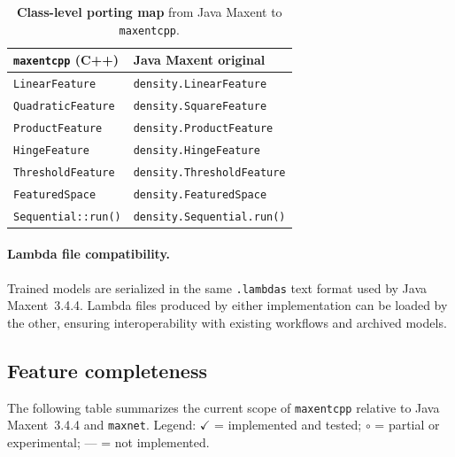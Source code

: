 \documentclass[10pt,letterpaper]{article}
\begin{document}
\begin{table}[!ht]
\centering
\caption{{\bf Class-level porting map} from Java Maxent to
         \texttt{maxentcpp}.}
\begin{tabular}{|l|l|}
\hline
\textbf{\texttt{maxentcpp} (C++)} & \textbf{Java Maxent original} \\
\hline
\texttt{LinearFeature}      & \texttt{density.LinearFeature}    \\
\hline
\texttt{QuadraticFeature}   & \texttt{density.SquareFeature}    \\
\hline
\texttt{ProductFeature}     & \texttt{density.ProductFeature}   \\
\hline
\texttt{HingeFeature}       & \texttt{density.HingeFeature}     \\
\hline
\texttt{ThresholdFeature}   & \texttt{density.ThresholdFeature} \\
\hline
\texttt{FeaturedSpace}      & \texttt{density.FeaturedSpace}    \\
\hline
\texttt{Sequential::run()}  & \texttt{density.Sequential.run()} \\
\hline
\end{tabular}
\label{tab:porting}
\end{table}

\paragraph{Lambda file compatibility.}
Trained models are serialized in the same \texttt{.lambdas} text format
used by Java Maxent~3.4.4.
Lambda files produced by either implementation can be loaded by the
other, ensuring interoperability with existing workflows and archived
models.

\subsection*{Feature completeness}

The following table summarizes the current scope of \texttt{maxentcpp}
relative to Java Maxent~3.4.4 and \texttt{maxnet}.
Legend: $\checkmark$ = implemented and tested;
$\circ$ = partial or experimental;
--- = not implemented.
\end{document}
